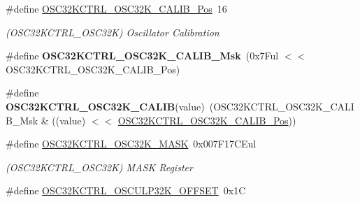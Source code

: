 \begin{DoxyCompactItemize}
\item 
\hypertarget{group___s_a_m_l21___o_s_c32_k_c_t_r_l_gac28e86d9be0dd979c46632b745621ee0}{}\#define \hyperlink{group___s_a_m_l21___o_s_c32_k_c_t_r_l_gac28e86d9be0dd979c46632b745621ee0}{O\+S\+C32\+K\+C\+T\+R\+L\+\_\+\+O\+S\+C32\+K\+\_\+\+C\+A\+L\+I\+B\+\_\+\+Pos}~16\label{group___s_a_m_l21___o_s_c32_k_c_t_r_l_gac28e86d9be0dd979c46632b745621ee0}

\begin{DoxyCompactList}\small\item\em (O\+S\+C32\+K\+C\+T\+R\+L\+\_\+\+O\+S\+C32\+K) Oscillator Calibration \end{DoxyCompactList}\item 
\hypertarget{group___s_a_m_l21___o_s_c32_k_c_t_r_l_ga05e38c9c16a4e7561638ec96cc7ab3ad}{}\#define {\bfseries O\+S\+C32\+K\+C\+T\+R\+L\+\_\+\+O\+S\+C32\+K\+\_\+\+C\+A\+L\+I\+B\+\_\+\+Msk}~(0x7\+Ful $<$$<$ O\+S\+C32\+K\+C\+T\+R\+L\+\_\+\+O\+S\+C32\+K\+\_\+\+C\+A\+L\+I\+B\+\_\+\+Pos)\label{group___s_a_m_l21___o_s_c32_k_c_t_r_l_ga05e38c9c16a4e7561638ec96cc7ab3ad}

\item 
\hypertarget{group___s_a_m_l21___o_s_c32_k_c_t_r_l_gafaee32e5b5f23316285724b34b27c6fd}{}\#define {\bfseries O\+S\+C32\+K\+C\+T\+R\+L\+\_\+\+O\+S\+C32\+K\+\_\+\+C\+A\+L\+I\+B}(value)~(O\+S\+C32\+K\+C\+T\+R\+L\+\_\+\+O\+S\+C32\+K\+\_\+\+C\+A\+L\+I\+B\+\_\+\+Msk \& ((value) $<$$<$ \hyperlink{group___s_a_m_l21___o_s_c32_k_c_t_r_l_gac28e86d9be0dd979c46632b745621ee0}{O\+S\+C32\+K\+C\+T\+R\+L\+\_\+\+O\+S\+C32\+K\+\_\+\+C\+A\+L\+I\+B\+\_\+\+Pos}))\label{group___s_a_m_l21___o_s_c32_k_c_t_r_l_gafaee32e5b5f23316285724b34b27c6fd}

\item 
\hypertarget{group___s_a_m_l21___o_s_c32_k_c_t_r_l_gae6923f1148d6388edb1331a9f054d4e8}{}\#define \hyperlink{group___s_a_m_l21___o_s_c32_k_c_t_r_l_gae6923f1148d6388edb1331a9f054d4e8}{O\+S\+C32\+K\+C\+T\+R\+L\+\_\+\+O\+S\+C32\+K\+\_\+\+M\+A\+S\+K}~0x007\+F17\+C\+Eul\label{group___s_a_m_l21___o_s_c32_k_c_t_r_l_gae6923f1148d6388edb1331a9f054d4e8}

\begin{DoxyCompactList}\small\item\em (O\+S\+C32\+K\+C\+T\+R\+L\+\_\+\+O\+S\+C32\+K) M\+A\+S\+K Register \end{DoxyCompactList}\item 
\hypertarget{group___s_a_m_l21___o_s_c32_k_c_t_r_l_gaa2ae9323b7a5247081c2bfc04f97e8d1}{}\#define \hyperlink{group___s_a_m_l21___o_s_c32_k_c_t_r_l_gaa2ae9323b7a5247081c2bfc04f97e8d1}{O\+S\+C32\+K\+C\+T\+R\+L\+\_\+\+O\+S\+C\+U\+L\+P32\+K\+\_\+\+O\+F\+F\+S\+E\+T}~0x1\+C\label{group___s_a_m_l21___o_s_c32_k_c_t_r_l_gaa2ae9323b7a5247081c2bfc04f97e8d1}


\end{DoxyCompactItemize}
